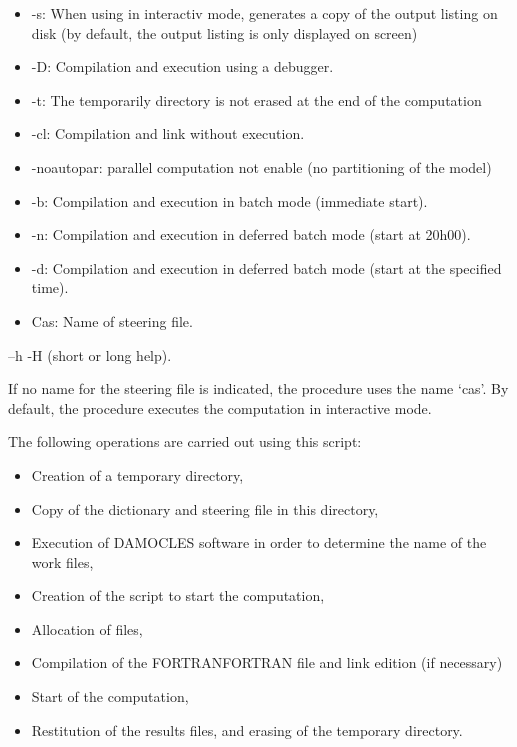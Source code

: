 \begin{itemize}
\item  -s: When using in interactiv mode, generates a copy of the output listing on disk (by default, the output listing is only displayed on screen)

\item  -D: Compilation and execution using a debugger.

\item  -t: The temporarily directory is not erased at the end of the computation

\item  -cl: Compilation and link without execution.

\item  -noautopar: parallel computation not enable (no partitioning of the model)

\item  -b: Compilation and execution in batch mode (immediate start).

\item  -n: Compilation and execution in deferred batch mode (start at 20h00).

\item  -d: Compilation and execution in deferred batch mode (start at the specified time).

\item  Cas: Name of steering file.
\end{itemize}

\artemis{} --h {\textbar} -H  (short or long help).

If no name for the steering file is indicated, the procedure uses
the name `cas'. By default, the procedure executes the computation in
interactive mode.

The following operations are carried out using this script:

\begin{itemize}
\item  Creation of a temporary directory,

\item  Copy of the dictionary and steering file in this directory,

\item  Execution of DAMOCLES software in order to determine the name of the work files,

\item  Creation of the script to start the computation,

\item  Allocation of files,

\item  Compilation of the FORTRANFORTRAN file and link edition (if necessary)

\item  Start of the computation,

\item  Restitution of the results files, and erasing of the temporary directory.
\end{itemize}

